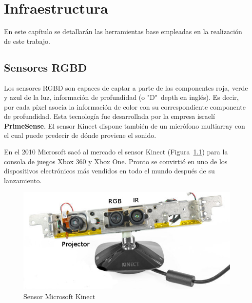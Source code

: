 
\chapter{Infraestructura} %

\label{Chapter3} %

En este capítulo se detallarán las herramientas base empleadas en la realización de este trabajo.


\section{Sensores RGBD}

Los sensores RGBD son capaces de captar a parte de las componentes roja, verde y azul de la luz, información de profundidad (o "D"\ depth en inglés). Es decir, por cada píxel asocia la información de color con su correspondiente componente de profundidad. Esta tecnología fue desarrollada por la empresa israelí \textbf{PrimeSense}. El sensor Kinect dispone también de un micrófono multiarray con el cual puede predecir de dónde proviene el sonido.

En el 2010 Microsoft sacó al mercado el sensor Kinect (Figura~\ref{fig:Kinect}) para la consola de juegos Xbox 360 y Xbox One. Pronto se convirtió en uno de los dispositivos electrónicos más vendidos en todo el mundo después de su lanzamiento.

\begin{figure}[th]
\centering
\includegraphics[scale=0.85]{Figures/ros_kinect.jpg}
\decoRule
\caption[Kinect sensor]{Sensor Microsoft Kinect}
\label{fig:Kinect}
\end{figure}

